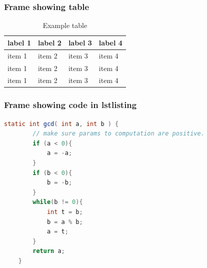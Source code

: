 \documentclass[aspectratio=169]{beamer}
\begin{document}
\begin{frame}
    \frametitle{Frame showing table}

    \begin{table}
        \begin{tabularx}{\textwidth}{ |X|X|X|X| }
            \hline
            label 1 & label 2 & label 3 & label 4 \\
            \hline 
            item 1  & item 2  & item 3  & item 4  \\
            \hline 
            item 1  & item 2  & item 3  & item 4  \\
            \hline 
            item 1  & item 2  & item 3  & item 4  \\
            \hline
          \end{tabularx}
          \caption{Example table}
    \end{table}

\end{frame}

\begin{frame}[containsverbatim]
    \frametitle{Frame showing code in lstlisting}

    \begin{lstlisting}[language=Java, caption={Code example for GCD},captionpos=b]
    static int gcd( int a, int b ) {
        // make sure params to computation are positive.
        if (a < 0){
            a = -a;
        }
        if (b < 0){
            b = -b;
        }
        while(b != 0){
            int t = b;
            b = a % b;
            a = t;
        }
        return a;
    }
    \end{lstlisting}

\end{frame}
\end{document}
